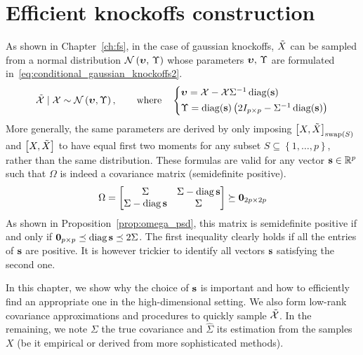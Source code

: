 \chapter{Efficient knockoffs construction}\label{ch:sdp}

As shown in Chapter~\ref{ch:fs}, in the case of gaussian knockoffs,
$\tilde{X}$ can be sampled from a normal distribution $\mathcal{N}\left( \bm{\upsilon},\, \Upsilon \right)$ whose parameters
$\bm{\upsilon},\, \Upsilon$ are formulated in~\ref{eq:conditional_gaussian_knockoffs2}.
\begin{equation}\label{eq:conditional_gaussian_knockoffs2}
    \tcX \mid \cX \sim \cN\left( \bupsilon, \Upsilon \right)
    ,\qquad\text{where}\quad
    \begin{cases*}
        \bupsilon = \cX - \cX\Sigma^{-1}\diag(\bs)\\
        \Upsilon = \diag(\bs)\left( 2I_{p \times p} - \Sigma^{-1}\diag(\bs) \right)
    \end{cases*}
\end{equation}
More generally, the same parameters are derived by only imposing
$\big[ X, \tilde{X} \big]_{\operatorname{swap}\left( S \right)}$ and $\big[ X, \tilde{X} \big]$
to have equal first two moments
for any subset
$S \subseteq \left\{ 1, \dots, p \right\}$,
rather than the same distribution.
These formulas are valid for any vector $\mathbf{s} \in \mathbb{R}^p$ such that $\Omega$
is indeed a covariance matrix (semidefinite positive).
\begin{equation*}
    \Omega = \begin{bmatrix}
        \Sigma & \Sigma - \operatorname*{diag} \mathbf{s}\\
        \Sigma - \operatorname*{diag} \mathbf{s} & \Sigma
    \end{bmatrix}
    \succeq \mathbf{0}_{2p \times 2p}
\end{equation*}
As shown in Proposition~\ref{prop:omega_psd},
this matrix is semidefinite positive if and only if $\mathbf{0}_{p \times p} \preceq \operatorname*{diag} \mathbf{s} \preceq 2 \Sigma$.
The first inequality clearly holds if all the entries of $\mathbf{s}$ are positive.
It is however trickier to identify all vectors $\mathbf{s}$ satisfying the second one.

In this chapter, we show why the choice of $\mathbf{s}$ is important and how to efficiently find an appropriate one
in the high-dimensional setting.
We also form low-rank covariance approximations and procedures to quickly sample $\tilde{\mathcal{X}}$.
In the remaining, we note $\Sigma$ the true covariance and $\hat{\Sigma}$ its estimation from the samples $X$
(be it empirical or derived from more sophisticated methods).

